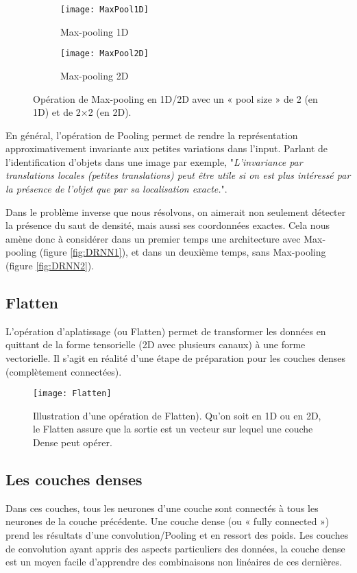 \begin{figure}[!h]
\begin{subfigure}{.5\textwidth}
  \centering
  \texttt{[image: MaxPool1D]}  
  \caption[MaxPool1D]{Max-pooling 1D}
\end{subfigure}
\begin{subfigure}{.5\textwidth}
  \centering
  \texttt{[image: MaxPool2D]}  
  \caption[MaxPool2D]{Max-pooling 2D}
\end{subfigure}
\label{fig:MaxPool1D2D}

\centering
\decoRule
\caption[MaxPoling]{Opération de Max-pooling en 1D/2D avec un « pool size » de 2 (en 1D) et de 2×2 (en 2D).}
\end{figure}


En général, l'opération de Pooling permet de rendre la représentation approximativement invariante aux petites variations dans l'input. Parlant de l'identification d'objets dans une image par exemple, "\textit{L'invariance par translations locales (petites translations) peut être utile si on est plus intéressé par la présence de l'objet que par sa localisation exacte.}"\parencite[321ff.]{Reference5}.

Dans le problème inverse que nous résolvons, on aimerait non seulement détecter la présence du saut de densité, mais aussi ses coordonnées exactes. Cela nous amène donc à considérer dans un premier temps une architecture avec Max-pooling (figure \ref{fig:DRNN1}), et dans un deuxième temps, sans Max-pooling (figure \ref{fig:DRNN2}).
 
\subsection{Flatten}
L'opération d'aplatissage (ou Flatten) permet de transformer les données en quittant de la forme tensorielle (2D avec plusieurs canaux) à une forme vectorielle. Il s'agit en réalité d'une étape de préparation pour les couches denses (complètement connectées).

\begin{figure}[!h] 
\centering
\texttt{[image: Flatten]}
\decoRule
\caption[Flatten]{Illustration d'une opération de Flatten). Qu'on soit en 1D ou en 2D, le Flatten assure que la sortie est un vecteur sur lequel une couche Dense peut opérer.}
\label{fig:Flatten}
\end{figure} 

\subsection{Les couches denses}
Dans ces couches, tous les neurones d'une couche sont connectés à tous les neurones de la couche précédente. Une couche dense (ou « fully connected ») prend les résultats d'une convolution/Pooling et en ressort des poids. Les couches de convolution ayant appris des aspects particuliers des données, la couche dense est un moyen facile d'apprendre des combinaisons non linéaires de ces dernières.

